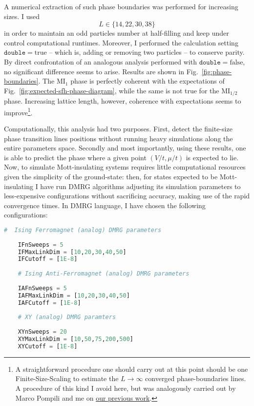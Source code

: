 A numerical extraction of such phase boundaries was performed for increasing sizes. I used
\[
	L \in \lbrace 14, 22, 30, 38 \rbrace
\]
in order to maintain an odd particles number at half-filling and keep under control computational runtimes. Moreover, I performed the calculation setting $\texttt{double}=\mathrm{true}$ -- which is, adding or removing two particles -- to conserve parity. By direct confrontation of an analogous analysis performed with $\texttt{double}=\mathrm{false}$, no significant difference seems to arise. Results are shown in Fig.~\ref{fig:phase-boundaries}. The $\mathrm{MI}_1$ phase is perfectly coherent with the expectations of Fig.~\ref{fig:expected-sfh-phase-diagram}, while the same is not true for the $\mathrm{MI}_{1/2}$ phase. Increasing lattice length, however, coherence with expectations seems to improve\footnote{
	A straightforward procedure one should carry out at this point should be one Finite-Size-Scaling to estimate the $L \to \infty$ converged phase-boundaries lines. A procedure of this kind I avoid here, but was analogously carried out by Marco Pompili and me on \href{https://github.com/mrc-pop/BoseHubbardDMRG}{our previous work}.
}.

Computationally, this analysis had two purposes. First, detect the finite-size phase transition lines positions without running heavy simulations along the entire parameters space. Secondly and most importantly, using these results, one is able to predict the phase where a given point $(V/t, \mu/t)$ is expected to lie. Now, to simulate Mott-insulating systems requires little computational resources given the simplicity of the ground-state: then, for states expected to be Mott-insulating I have run DMRG algorithms adjusting its simulation parameters to less-expensive configurations without sacrificing accuracy, making use of the rapid convergence times. In DMRG language, I have chosen the following configurations:

\begin{lstlisting}[language=julia]
	#  Ising Ferromagnet (analog) DMRG parameters
	
	IFnSweeps = 5
	IFMaxLinkDim = [10,20,30,40,50]
	IFCutoff = [1E-8]
	
	# Ising Anti-Ferromagnet (analog) DMRG parameters
	
	IAFnSweeps = 5
	IAFMaxLinkDim = [10,20,30,40,50]
	IAFCutoff = [1E-8]
	
	# XY (analog) DMRG paramters
	
	XYnSweeps = 20
	XYMaxLinkDim = [10,50,75,200,500]
	XYCutoff = [1E-8]
\end{lstlisting}

